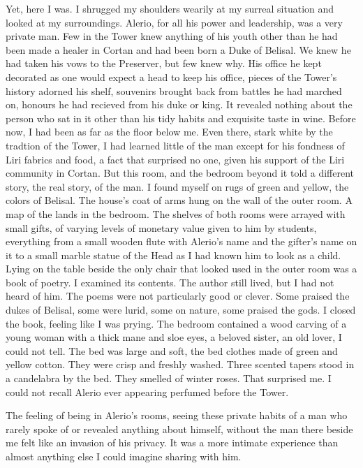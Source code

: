 \documentclass{article}
\begin{document}
Yet, here I was. I shrugged my shoulders wearily at my surreal situation and looked at my surroundings. Alerio, for all his power and leadership, was a very private man. Few in the Tower knew anything of his youth other than he had been made a healer in Cortan and had been born a Duke of Belisal. We knew he had taken his vows to the Preserver, but few knew why. His office he kept decorated as one would expect a head to keep his office, pieces of the Tower's history adorned his shelf, souvenirs brought back from battles he had marched on, honours he had recieved from his duke or king. It revealed nothing about the person who sat in it other than his tidy habits and exquisite taste in wine. Before now, I had been as far as the floor below me. Even there, stark white by the tradtion of the Tower, I had learned little of the man except for his fondness of Liri fabrics and food, a fact that surprised no one, given his support of the Liri community in Cortan. But this room, and the bedroom beyond it told a different story, the real story, of the man. I found myself on rugs of green and yellow, the colors of Belisal. The house's coat of arms hung on the wall of the outer room. A map of the lands in the bedroom. The shelves of both rooms were arrayed with small gifts, of varying levels of monetary value given to him by students, everything from a small wooden flute with Alerio's name and the gifter's name on it to a small marble statue of the Head as I had known him to look as a child. Lying on the table beside the only chair that looked used in the outer room was a book of poetry. I examined its contents. The author still lived, but I had not heard of him. The poems were not particularly good or clever. Some praised the dukes of Belisal, some were lurid, some on nature, some praised the gods. I closed the book, feeling like I was prying. The bedroom contained a wood carving of a young woman with a thick mane and sloe eyes, a beloved sister, an old lover, I could not tell. The bed was large and soft, the bed clothes made of green and yellow cotton. They were crisp and freshly washed. Three scented tapers stood in a candelabra by the bed. They smelled of winter roses. That surprised me. I could not recall Alerio ever appearing perfumed before the Tower. 

The feeling of being in Alerio's rooms, seeing these private habits of a man who rarely spoke of or revealed anything about himself, without the man there beside me felt like an invasion of his privacy. It was a more intimate experience than almost anything else I could imagine sharing with him.
\end{document}
